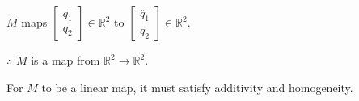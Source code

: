 \documentclass[fleqn]{article}
\begin{document}
\begin{enumerate}[nolistsep]
\begin{enumerate}[nolistsep]
					$M$ maps $\begin{bmatrix}q_1 \\ q_2 \end{bmatrix} \in \mathbb{R}^2$ to $\begin{bmatrix}\ddot{q_1} \\ \ddot{q_2} \end{bmatrix} \in \mathbb{R}^2$.
					
					$\therefore$ $M$ is a map from $\mathbb{R}^2 \rightarrow \mathbb{R}^2$.
					
					For $M$ to be a linear map, it must satisfy additivity and homogeneity.
					
					
			\end{enumerate}
	\end{enumerate}
\end{document}
